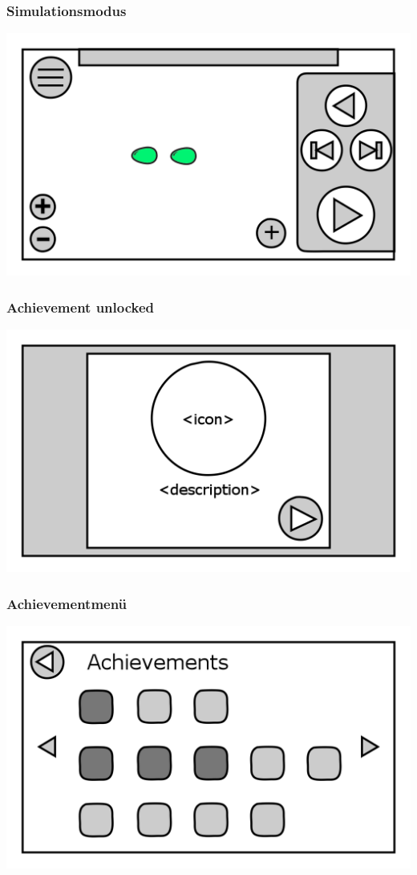 \documentclass[t]{beamer}
\begin{document}
\begin{frame}
	\frametitle{Simulationsmodus}
	\includegraphics[height=\textheight]{level_simulation_solved.png}
\end{frame}
\begin{frame}
	\frametitle{Achievement unlocked}
	\includegraphics[height=\textheight]{achievement_notification.png}
\end{frame}
\begin{frame}
	\frametitle{Achievementmenü}
	\includegraphics[height=\textheight]{achievements.png}
\end{frame}
\end{document}
